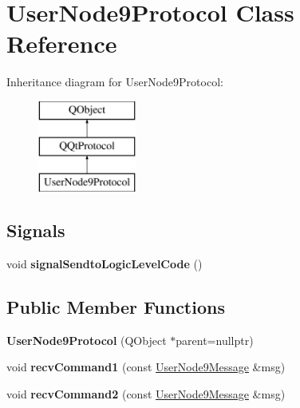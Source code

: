 \hypertarget{class_user_node9_protocol}{}\section{User\+Node9\+Protocol Class Reference}
\label{class_user_node9_protocol}
Inheritance diagram for User\+Node9\+Protocol\+:\begin{figure}[H]
\begin{center}
\leavevmode
\includegraphics[height=3.000000cm]{class_user_node9_protocol}
\end{center}
\end{figure}
\subsection*{Signals}
\begin{DoxyCompactItemize}
\item 
\mbox{\label{class_user_node9_protocol_a4efb2f6bd4eff7ae15fc13702e2093a6}} 
void {\bfseries signal\+Sendto\+Logic\+Level\+Code} ()
\end{DoxyCompactItemize}
\subsection*{Public Member Functions}
\begin{DoxyCompactItemize}
\item 
\mbox{\label{class_user_node9_protocol_a76f823d4749283635dc8d2e0cb8b7914}} 
{\bfseries User\+Node9\+Protocol} (Q\+Object $\ast$parent=nullptr)
\item 
\mbox{\label{class_user_node9_protocol_ab7c4870c27c2982c2527fe92e587c67b}} 
void {\bfseries recv\+Command1} (const \mbox{\hyperlink{class_user_node9_message}{User\+Node9\+Message}} \&msg)
\item 
\mbox{\label{class_user_node9_protocol_a7da22d82078b1c4a4e75b412f0606659}} 
void {\bfseries recv\+Command2} (const \mbox{\hyperlink{class_user_node9_message}{User\+Node9\+Message}} \&msg)
\end{DoxyCompactItemize}
